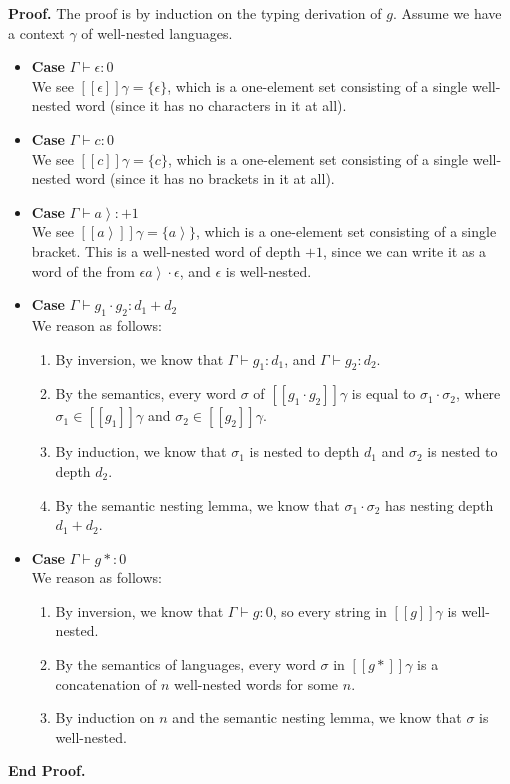 \documentclass{article}
\newcommand{\rgt}[1]{\left.{#1}\right>}
\newcommand{\judgebalance}[3][\Gamma]{{#1} \vdash {#2} : {#3}}
\newcommand{\interp}[1]{[\![{#1}]\!]}
\newcommand{\setof}[1]{\{{#1}\}}
\newenvironment{proof}{\noindent\textbf{Proof.}}{\noindent\textbf{End Proof.}}
\newenvironment{caseblock}{\begin{itemize}}{\end{itemize}}
\newenvironment{case}[1]{\item \textbf{Case} {#1}\\}{}
\begin{document}
\begin{proof}
The proof is by induction on the typing derivation of $g$. Assume we have a context $\gamma$ of well-nested
languages.

\begin{caseblock}
  \begin{case}{$\judgebalance{\epsilon}{0}$}
    We see $\interp{\epsilon}{\gamma} = \setof{\epsilon}$, which is a one-element set consisting 
    of a single well-nested word (since it has no characters in it at all). 
  \end{case}

  \begin{case}{$\judgebalance{c}{0}$}
    We see $\interp{c}{\gamma} = \setof{c}$, which is a one-element set consisting 
    of a single well-nested word (since it has no brackets in it at all). 
  \end{case}

  \begin{case}{$\judgebalance{\rgt{a}}{+1}$}
    We see $\interp{\rgt{a}}{\gamma} = \setof{\rgt{a}}$, which is a one-element set consisting 
    of a single bracket. This is a well-nested word of depth $+1$, since we can write it as a 
    word of the from $\epsilon\rgt{a}\cdot\epsilon$, and $\epsilon$ is well-nested. 
   \end{case}

  \begin{case}{$\judgebalance{g_1\cdot g_2}{d_1 + d_2}$}
    We reason as follows: 
    \begin{enumerate}
      \item By inversion, we know that $\judgebalance{g_1}{d_1}$, and $\judgebalance{g_2}{d_2}$.
      \item By the semantics, every word $\sigma$ of $\interp{g_1\cdot g_2}\gamma$ is equal to 
        $\sigma_1\cdot\sigma_2$, where $\sigma_1 \in \interp{g_1}\gamma$ and $\sigma_2 \in \interp{g_2}\gamma$. 
      \item By induction, we know that $\sigma_1$ is nested to depth $d_1$ and $\sigma_2$ is nested to depth $d_2$.
      \item By the semantic nesting lemma, we know that $\sigma_1 \cdot \sigma_2$ has nesting depth $d_1 + d_2$. 
    \end{enumerate}
  \end{case}

  \begin{case}{$\judgebalance{g*}{0}$}
    We reason as follows: 
    \begin{enumerate}
      \item By inversion, we know that $\judgebalance{g}{0}$, so every string in $\interp{g}\gamma$ is 
        well-nested. 
      \item By the semantics of languages, every word $\sigma$ in $\interp{g*}\gamma$ is a concatenation of 
        $n$ well-nested words for some $n$. 
      \item By induction on $n$ and the semantic nesting lemma, we know that $\sigma$ is well-nested. 
    \end{enumerate}
  \end{case}


\end{caseblock}
\end{proof}
\end{document}
